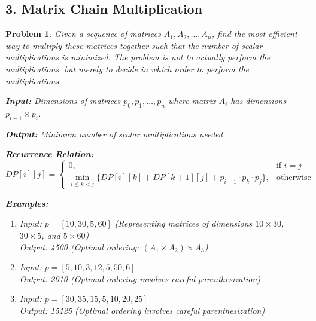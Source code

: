\documentclass{article}
\newtheorem{problem}{Problem}
\begin{document}
\subsection*{3. Matrix Chain Multiplication}
\begin{problem}
Given a sequence of matrices $A_1, A_2, \ldots, A_n$, find the most efficient way to multiply these matrices together such that the number of scalar multiplications is minimized. The problem is not to actually perform the multiplications, but merely to decide in which order to perform the multiplications.

\textbf{Input:} Dimensions of matrices $p_0, p_1, \ldots, p_n$ where matrix $A_i$ has dimensions $p_{i-1} \times p_i$.

\textbf{Output:} Minimum number of scalar multiplications needed.

\textbf{Recurrence Relation:}
\[
DP[i][j] = 
\begin{cases}
0, & \text{if } i = j \\
\min_{i \leq k < j} \{DP[i][k] + DP[k+1][j] + p_{i-1} \cdot p_k \cdot p_j\}, & \text{otherwise}
\end{cases}
\]

\textbf{Examples:}
\begin{enumerate}
\item Input: $p = [10, 30, 5, 60]$ (Representing matrices of dimensions $10 \times 30$, $30 \times 5$, and $5 \times 60$) \\
      Output: 4500 (Optimal ordering: $(A_1 \times A_2) \times A_3$)
\item Input: $p = [5, 10, 3, 12, 5, 50, 6]$ \\
      Output: 2010 (Optimal ordering involves careful parenthesization)
\item Input: $p = [30, 35, 15, 5, 10, 20, 25]$ \\
      Output: 15125 (Optimal ordering involves careful parenthesization)
\end{enumerate}
\end{problem}

\end{document}
